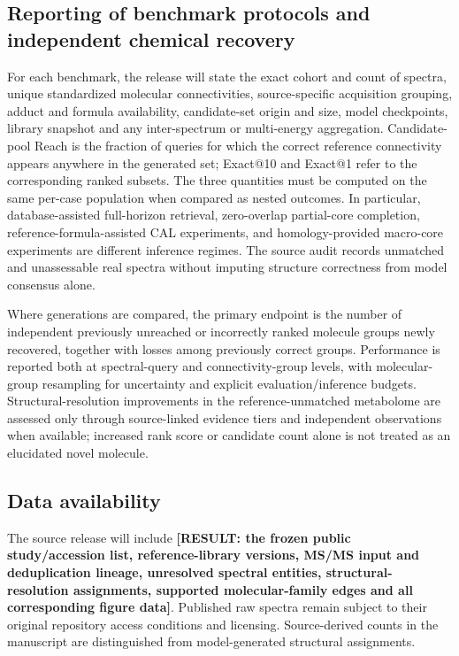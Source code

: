 \documentclass[11pt]{article}
\newcommand{\result}[1]{\textbf{\textcolor{orbitnavy}{[RESULT: #1]}}}
\begin{document}
\subsection*{Reporting of benchmark protocols and independent chemical recovery}
For each benchmark, the release will state the exact cohort and count of spectra, unique standardized molecular connectivities, source-specific acquisition grouping, adduct and formula availability, candidate-set origin and size, model checkpoints, library snapshot and any inter-spectrum or multi-energy aggregation. Candidate-pool Reach is the fraction of queries for which the correct reference connectivity appears anywhere in the generated set; Exact@10 and Exact@1 refer to the corresponding ranked subsets. The three quantities must be computed on the same per-case population when compared as nested outcomes. In particular, database-assisted full-horizon retrieval, zero-overlap partial-core completion, reference-formula-assisted CAL experiments, and homology-provided macro-core experiments are different inference regimes. The source audit records unmatched and unassessable real spectra without imputing structure correctness from model consensus alone.

Where generations are compared, the primary endpoint is the number of independent previously unreached or incorrectly ranked molecule groups newly recovered, together with losses among previously correct groups. Performance is reported both at spectral-query and connectivity-group levels, with molecular-group resampling for uncertainty and explicit evaluation/inference budgets. Structural-resolution improvements in the reference-unmatched metabolome are assessed only through source-linked evidence tiers and independent observations when available; increased rank score or candidate count alone is not treated as an elucidated novel molecule.

\subsection*{Data availability}
The source release will include \result{the frozen public study/accession list, reference-library versions, MS/MS input and deduplication lineage, unresolved spectral entities, structural-resolution assignments, supported molecular-family edges and all corresponding figure data}. Published raw spectra remain subject to their original repository access conditions and licensing. Source-derived counts in the manuscript are distinguished from model-generated structural assignments.
\end{document}
